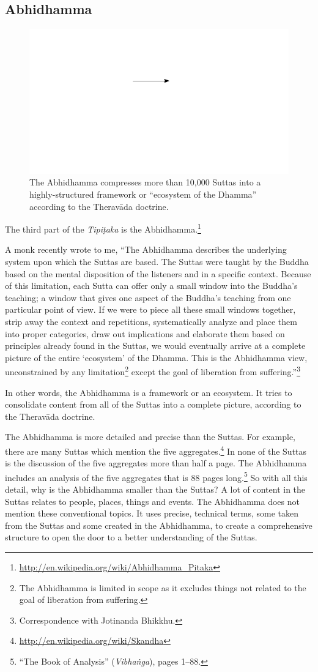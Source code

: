 \pagebreak

\subsection*{Abhidhamma}

\begin{figure}[H]
\centering
\includegraphics[width=0.25\linewidth]{./Diagrams/Funnel}
\caption{The Abhidhamma compresses more than 10,000 Suttas into a highly-structured framework or “ecosystem of the Dhamma” according to the Theravāda doctrine.}
\label{fig:Funnel}
\end{figure}

The third part of the \textit{Tipiṭaka} is the Abhidhamma.\footnote{\url{http://en.wikipedia.org/wiki/Abhidhamma_Pitaka}}

A monk recently wrote to me, “The Abhidhamma describes the underlying system upon which the Suttas are based. The Suttas were taught by the Buddha based on the mental disposition of the listeners and in a specific context. Because of this limitation, each Sutta can offer only a small window into the Buddha’s teaching; a window that gives one aspect of the Buddha’s teaching from one particular point of view. If we were to piece all these small windows together, strip away the context and repetitions, systematically analyze and place them into proper categories, draw out implications and elaborate them based on principles already found in the Suttas, we would eventually arrive at a complete picture of the entire `ecosystem’ of the Dhamma. This is the Abhidhamma view, unconstrained by any limitation\footnote{The Abhidhamma is limited in scope as it excludes things not related to the goal of liberation from suffering.} except the goal of liberation from suffering.”\footnote{Correspondence with Jotinanda Bhikkhu.}

In other words, the Abhidhamma is a framework or an ecosystem. It tries to consolidate content from all of the Suttas into a complete picture, according to the Theravāda doctrine.

The Abhidhamma is more detailed and precise than the Suttas. For example, there are many Suttas which mention the five aggregates.\footnote{\url{http://en.wikipedia.org/wiki/Skandha}} In none of the Suttas is the discussion of the five aggregates more than half a page. The Abhidhamma includes an analysis of the five aggregates that is 88 pages long.\footnote{“The Book of Analysis” (\textit{Vibhaṅga}), pages 1--88.} So with all this detail, why is the Abhidhamma smaller than the Suttas? A lot of content in the Suttas relates to people, places, things and events. The Abhidhamma does not mention these conventional topics. It uses precise, technical terms, some taken from the Suttas and some created in the Abhidhamma, to create a comprehensive structure to open the door to a better understanding of the Suttas.

